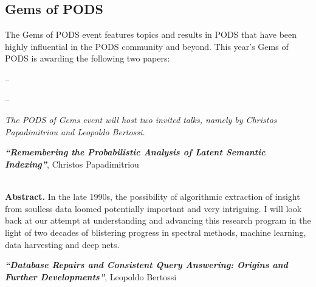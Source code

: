 
\clearpage

\subsection*{Gems of PODS}

The Gems of PODS event features topics and results in PODS that have been highly influential in the PODS community and beyond. This year's Gems of PODS is awarding the following two papers:

\vspace{1.5mm}

-- \vspace{1mm}

-- 



\vspace{5mm}

\emph{The PODS of Gems event will host two invited talks, namely by Christos Papadimitriou and Leopoldo Bertossi.}



{
\center
\textbf{\emph{``Remembering the Probabilistic Analysis of Latent Semantic Indexing''}}, Christos Papadimitriou \\~\\
}

\textbf{Abstract.} In the late 1990s, the possibility of algorithmic extraction of insight from soulless data loomed potentially important and very intriguing. I will look back at our attempt at understanding and advancing this research program in the light of two decades of blistering progress in spectral methods, machine learning, data harvesting and deep nets.


\vspace{2mm}

{
\center
\textbf{\emph{``Database Repairs and Consistent Query Answering: Origins and Further Developments''}}, Leopoldo Bertossi \\~\\
}

